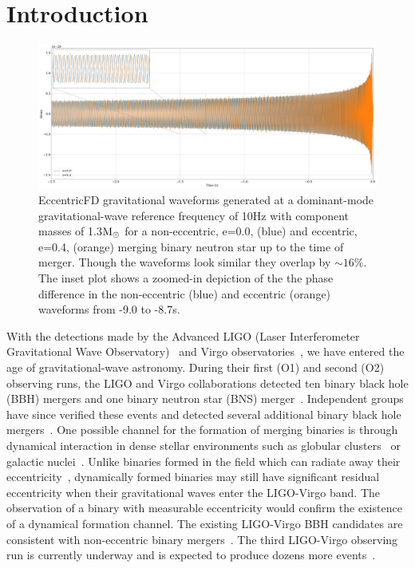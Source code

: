 \section{Introduction}
\label{sec:intro}

\begin{figure} 
  \centering
  \includegraphics[width=\textwidth]{Figures/eccentric-search/tf2e_waveforms.png}
\caption{EccentricFD gravitational waveforms generated at a dominant-mode gravitational-wave reference frequency of 10Hz with component masses of 1.3$\mathrm{M}_{\odot}$ for a non-eccentric, e=0.0, (blue) and eccentric, e=0.4, (orange) merging binary neutron star up to the time of merger. Though the waveforms look similar they overlap by $\sim 16\%$. The inset plot shows a zoomed-in depiction of the the phase difference in the non-eccentric (blue) and eccentric (orange) waveforms from -9.0 to -8.7s.}
\label{fig:waveform}
\end{figure}

With the detections made by the Advanced LIGO (Laser Interferometer Gravitational Wave Observatory)~\cite{TheLIGOScientific:2014jea} and Virgo observatories~\cite{TheVirgo:2014hva}, we have entered the age of gravitational-wave astronomy. During their first (O1) and second (O2) observing runs, the LIGO and Virgo collaborations detected ten binary black hole (BBH) mergers and one binary neutron star (BNS) merger~\cite{LIGOScientific:2018mvr}. Independent groups have since verified these events and detected several additional binary black hole mergers~\cite{Venumadhav:2019tad,Venumadhav:2019lyq,Nitz:2018imz,Nitz:2019hdf}. One possible channel for the formation of merging binaries is through dynamical interaction in dense stellar environments such as globular clusters~\cite{Sigurdsson:1993zrm,PortegiesZwart:1999nm,Grindlay:2005ym} or galactic nuclei~\cite{Oleary:2008myb,Antonini:2012ad}. Unlike binaries formed in the field which can radiate away their eccentricity~\cite{Peters:1964,Hinder:2007qu}, dynamically formed binaries may still have significant residual eccentricity when their gravitational waves enter the LIGO-Virgo band. The observation of a binary with measurable eccentricity would confirm the existence of a dynamical formation channel. The existing LIGO-Virgo BBH candidates are consistent with non-eccentric binary mergers~\cite{Romero-Shaw:2019itr}. The third LIGO-Virgo observing run is currently underway and is expected to produce dozens more events~\cite{Aasi:2013wya}. 


